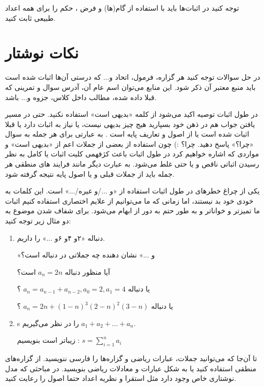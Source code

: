 \documentclass[11pt,largemargins]{h2wp}
\begin{document}
 	 توجه کنید در اثبات‌ها باید با استفاده از گام(ها) و فرض ، حکم را برای همه اعداد طبیعی ثابت کنید.
 	 
 	 
\chapter*{
نکات نوشتار}
\notes
{}
در حل سوالات توجه کنید هر گزاره، فرمول، اتحاد و... که درستی آن‌ها اثبات شده است  باید منبع معتبر آن ‌ذکر شود‌. این منابع می‌توان اسم عام آن، آدرس سوال و تمرینی که قبلا داده شده، مطالب داخل کلاس، جزوه و... باشد. 

در طول اثبات توصیه اکید می‌شود از کلمه «بدیهی است» استفاده نکنید. حتی در مسیر یافتن جواب هم در ذهن خود بسپارید هیج چیز بدیهی نیست، یا نیاز به اثبات دارد یا قبلا اثبات شده است یا از اصول و تعاریف پایه است 
.
به عبارتی برای هر جمله به سوال «چرا؟» پاسخ دهید.
چرا؟ :)
چون استفاده از بعضی از جملات اعم از «بدیهی است» و مواردی که اشاره خواهیم کرد در طول اثبات باعث کژفهمی کلیت اثبات یا کامل به نظر رسیدن اثباتی ناقص و یا حتی غلط می‌شود. 
به عبارت دیگر
مانند فرایند های منطقی
هر جمله باید از جملات قبلی و یا اصول پایه نتیجه گرفته شود.

یکی از چراغ خطرهای در طول اثبات استفاده از «و .../و غیره/...» است. این کلمات به خودی خود بد نیستند، اما زمانی که ما می‌توانیم از علایم اختصاری استفاده کنیم اثبات ما تمیزتر و خواناتر و به طور حتم به دور از ابهام می‌شود.
برای شفاف شدن موضوع به دو مثال زیر توجه کنید:

\begin{enumerate}
\item
دنباله «۲و ۴و ۶و ...» را داریم.

«و ...» نشان دهنده چه جملاتی در دنباله است؟

آیا منظور دنباله $a_n =2n $ است؟

یا دنباله $a_n = a_{n-1} + a_{n-2} ,  a_0=2 , a_1=4$ ؟

یا دنباله $ a_n = 2n + (1-n)^3(2-n)^2(3-n) $ ؟ 
\item
s
را در نظر می‌گیریم $ a_1 + a_2 + ... + a_n $. 

زیباتر است بنویسیم :
$ s = \sum_{i=1}^{n} {a_i} $

\end{enumerate}

تا آن‌جا که می‌توانید جملات، عبارات ریاضی و گزاره‌ها را فارسی ننویسید. از گزاره‌های منطقی استفاده کنید یا به شکل عبارات و معادلات ریاضی بنویسید. در مباحثی که مدل نوشتاری خاص وجود دارد مثل استقرا و نظریه اعداد حتما اصول را رعایت کنید.
\end{document}

